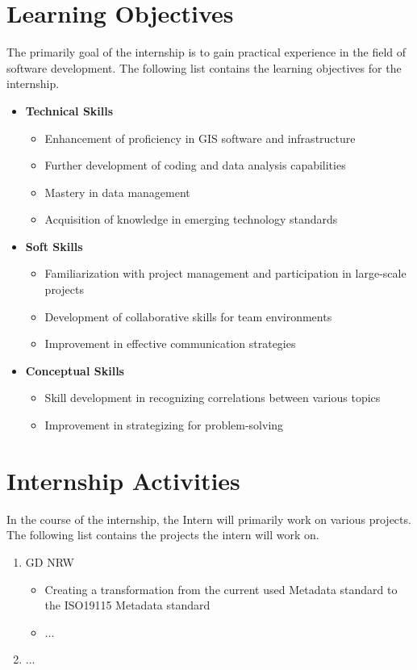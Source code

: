 \documentclass[11pt, titlepage, a4paper]{article}
\begin{document}
\section{Learning Objectives}
The primarily goal of the internship is to gain practical experience in the field of software development. The following list contains the learning objectives for the internship. 
\begin{itemize}
    \item \textbf{Technical Skills}
    \begin{itemize}
        \item Enhancement of proficiency in GIS software and infrastructure
        \item Further development of coding and data analysis capabilities
        \item Mastery in data management
        \item Acquisition of knowledge in emerging technology standards
    \end{itemize}
    \item \textbf{Soft Skills}
    \begin{itemize}
        \item Familiarization with project management and participation in large-scale projects
        \item Development of collaborative skills for team environments
        \item Improvement in effective communication strategies
    \end{itemize}
    \item \textbf{Conceptual Skills}
    \begin{itemize}
        \item Skill development in recognizing correlations between various topics
        \item Improvement in strategizing for problem-solving
    \end{itemize}
    \end{itemize}
    

\section{Internship Activities}
In the course of the internship, the Intern will primarily work on various projects. The following list contains the projects the intern will work on.

\begin{enumerate}
    \item GD NRW
    \begin{itemize}
        \item Creating a transformation from the current used Metadata standard to the ISO19115 Metadata standard
        \item ...
    \end{itemize}
    \item ... 
    \end{enumerate}
\end{document}
